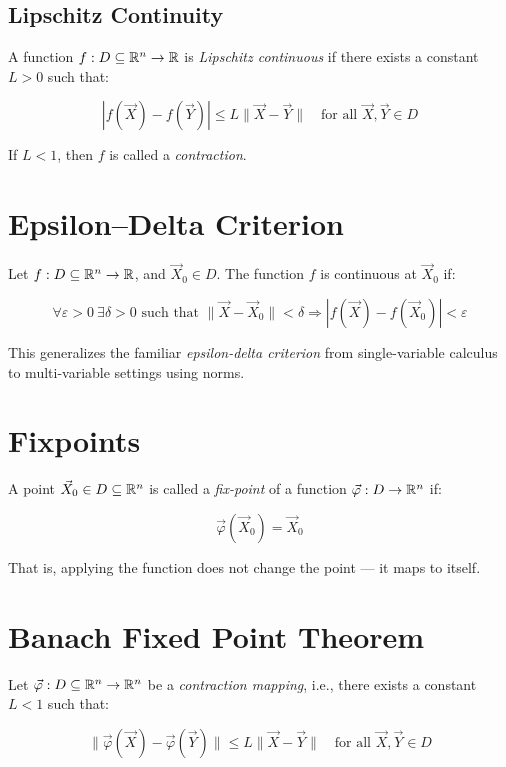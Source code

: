 \subsection{Lipschitz Continuity}

A function \( f : D \subseteq \mathbb{R}^n \to \mathbb{R} \) is \emph{Lipschitz continuous} if there 
exists a constant \( L > 0 \) such that:

\[
    |f(\vec{X}) - f(\vec{Y})| \le L \|\vec{X} - \vec{Y}\| \quad \text{for all } \vec{X}, \vec{Y} \in D
\]

If \( L < 1 \), then \(f\) is called a \emph{contraction}.

\section{Epsilon–Delta Criterion}

Let \( f : D \subseteq \mathbb{R}^n \to \mathbb{R} \), and \( \vec{X}_0 \in D \). The function 
\(f\) is continuous at \( \vec{X}_0 \) if:

\[
    \forall \varepsilon > 0 \ \exists \delta > 0 \text{ such that } \|\vec{X} - \vec{X}_0\| 
    < \delta \Rightarrow |f(\vec{X}) - f(\vec{X}_0)| < \varepsilon
\]

This generalizes the familiar \emph{epsilon-delta criterion} from single-variable calculus to multi-variable 
settings using norms.

\section{Fixpoints}
  
A point \( \vec{X}_0 \in D \subseteq \mathbb{R}^n \) is called a \emph{fix-point} of a function 
\( \vec{\varphi} : D \to \mathbb{R}^n \) if:

\[
    \vec{\varphi}(\vec{X}_0) = \vec{X}_0
\]

That is, applying the function does not change the point — it maps to itself.

\section{Banach Fixed Point Theorem}

Let \( \vec{\varphi} : D \subseteq \mathbb{R}^n \to \mathbb{R}^n \) be a \emph{contraction mapping}, 
i.e., there exists a constant \( L < 1 \) such that:

\[
    \|\vec{\varphi}(\vec{X}) - \vec{\varphi}(\vec{Y})\| \le L \|\vec{X} - \vec{Y}\| \quad 
    \text{for all } \vec{X}, \vec{Y} \in D
\]

